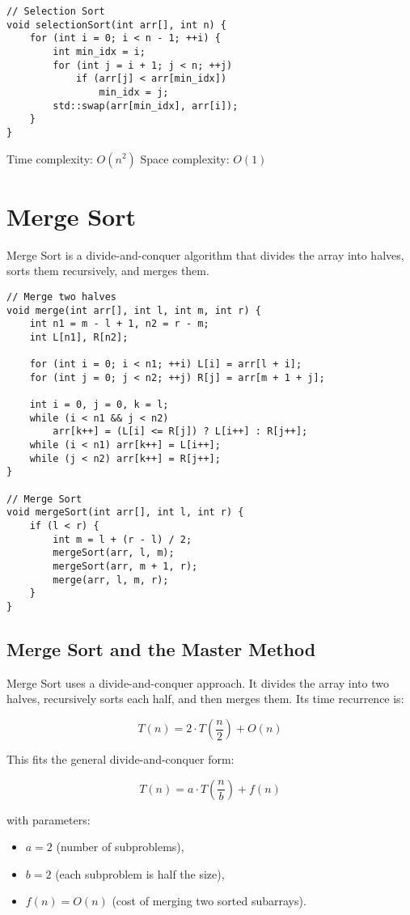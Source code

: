 \documentclass{article}
\begin{document}
\begin{lstlisting}[style=cppstyle]
// Selection Sort
void selectionSort(int arr[], int n) {
    for (int i = 0; i < n - 1; ++i) {
        int min_idx = i;
        for (int j = i + 1; j < n; ++j)
            if (arr[j] < arr[min_idx])
                min_idx = j;
        std::swap(arr[min_idx], arr[i]);
    }
}
\end{lstlisting}

Time complexity: $O(n^2)$
Space complexity: $O(1)$

\section{Merge Sort}
Merge Sort is a divide-and-conquer algorithm that divides the array into halves, sorts them recursively, and merges them.

\begin{lstlisting}[style=cppstyle]
// Merge two halves
void merge(int arr[], int l, int m, int r) {
    int n1 = m - l + 1, n2 = r - m;
    int L[n1], R[n2];

    for (int i = 0; i < n1; ++i) L[i] = arr[l + i];
    for (int j = 0; j < n2; ++j) R[j] = arr[m + 1 + j];

    int i = 0, j = 0, k = l;
    while (i < n1 && j < n2)
        arr[k++] = (L[i] <= R[j]) ? L[i++] : R[j++];
    while (i < n1) arr[k++] = L[i++];
    while (j < n2) arr[k++] = R[j++];
}

// Merge Sort
void mergeSort(int arr[], int l, int r) {
    if (l < r) {
        int m = l + (r - l) / 2;
        mergeSort(arr, l, m);
        mergeSort(arr, m + 1, r);
        merge(arr, l, m, r);
    }
}
\end{lstlisting}

\subsection{Merge Sort and the Master Method}

Merge Sort uses a divide-and-conquer approach. It divides the array into two halves, recursively sorts each half, and then merges them. Its time recurrence is:

\[
T(n) = 2 \cdot T\left(\frac{n}{2}\right) + O(n)
\]

This fits the general divide-and-conquer form:

\[
T(n) = a \cdot T\left(\frac{n}{b}\right) + f(n)
\]

with parameters:
\begin{itemize}
    \item $a = 2$ (number of subproblems),
    \item $b = 2$ (each subproblem is half the size),
    \item $f(n) = O(n)$ (cost of merging two sorted subarrays).
\end{itemize}
\end{document}
